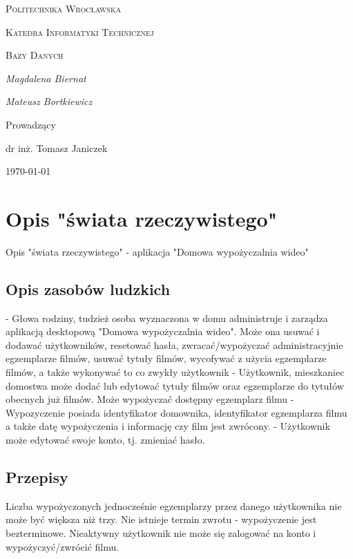 \documentclass{article}
\begin{document}
	
	\begin{titlepage}
		\centering
		{\scshape\LARGE Politechnika Wrocławska \par}
		{\scshape\Large Katedra Informatyki Technicznej\par}
		
		\vspace{1.5cm}
		{\scshape\Huge Bazy Danych \par}
		\vspace{1.5cm}
		
		\vspace{2cm}
		{\Large\itshape Magdalena Biernat\par}
		{\Large\itshape Mateusz Bortkiewicz\par}
		\vfill\flushleft\large
		
		\normalsize	\centering	\vspace{3cm}
		Prowadzący\par
		dr inż. Tomasz Janiczek 
		
		\vfill
		{\large \today\par}
	\end{titlepage}
	\newpage
	\section{Opis "świata rzeczywistego"}
	Opis "świata rzeczywistego" - aplikacja "Domowa wypożyczalnia wideo"
	\subsection{Opis zasobów ludzkich}
		- Głowa rodziny, tudzież osoba wyznaczona w domu administruje i zarządza aplikacją desktopową "Domowa wypożyczalnia wideo". Może ona usuwać i dodawać użytkowników, resetować hasła, zwracać/wypożyczać administracyjnie egzemplarze filmów, usuwać tytuły filmów, wycofywać z użycia egzemplarze filmów, a także wykonywać to co zwykły użytkownik
		- Użytkownik, mieszkaniec domostwa może dodać lub edytować tytuły filmów oraz egzemplarze do tytułów obecnych już filmów. Może wypożyczać dostępny egzemplarz filmu
		- Wypozyczenie posiada identyfikator domownika, identyfikator egzemplarza filmu a także datę wypożyczenia i informację czy film jest zwrócony.
		- Użytkownik może edytować swoje konto, tj. zmieniać hasło.
	\subsection{Przepisy}
		Liczba wypożyczonych jednocześnie egzemplarzy przez danego użytkownika nie może być większa niż trzy. Nie istnieje termin zwrotu - wypożyczenie jest bezterminowe. Nieaktywny użytkownik nie może się zalogować na konto i wypożyczyć/zwrócić filmu.
\end{document}
